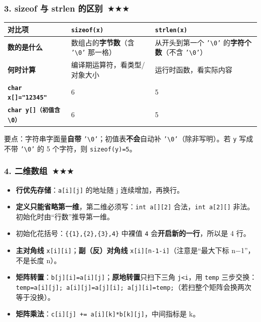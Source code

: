 \documentclass[UTF8,zihao=-4,a4paper]{ctexart}
\newcommand{\cstar}{\textcolor{deepred}{$\bigstar$}}
\begin{document}
\subsubsection*{3. sizeof 与 strlen 的区别\ \cstar\cstar\cstar}
\begin{center}\small
\begin{tabularx}{\linewidth}{>{\bfseries}p{2.6cm} X X}
\toprule
对比项 & \texttt{sizeof(x)} & \texttt{strlen(x)}\\
\midrule
数的是什么 & 数组占的\textbf{字节数}（含 \texttt{'\textbackslash 0'} 那一格） & 从开头到第一个 \texttt{'\textbackslash 0'} 的\textbf{字符个数}（不含 \texttt{'\textbackslash 0'}）\\
何时计算 & 编译期运算符，看类型/对象大小 & 运行时函数，看实际内容\\
\texttt{char x[]="12345"} & 6 & 5\\
\texttt{char y[]（初值含 \textbackslash 0）} & 6 & 5\\
\bottomrule
\end{tabularx}
\end{center}
\noindent 要点：字符串字面量\textbf{自带} \texttt{'\textbackslash 0'}；初值表\textbf{不会}自动补 \texttt{'\textbackslash 0'}（除非写明）。若 \texttt{y} 写成不带 \texttt{'\textbackslash 0'} 的 5 个字符，则 \texttt{sizeof(y)=5}。

\subsubsection*{4. 二维数组\ \cstar\cstar\cstar}
\begin{itemize}
  \item \textbf{行优先存储}：\texttt{a[i][j]} 的地址随 j 连续增加，再换行。
  \item \textbf{定义只能省略第一维}，第二维必须写：\texttt{int a[][2]} 合法，\texttt{int a[2][]} 非法。初始化时由“行数”推导第一维。
  \item 初始化花括号：\texttt{\{\{1\},\{2\},\{3\},4\}} 中裸值 \texttt{4} 会\textbf{开启新的一行}，所以是 4 行。
  \item \textbf{主对角线} \texttt{x[i][i]}；\textbf{副（反）对角线} \texttt{x[i][n-1-i]}（注意是“最大下标 n−1”，不是长度 n）。
  \item \textbf{矩阵转置}：\texttt{b[j][i]=a[i][j]}；\textbf{原地转置}只扫下三角 \texttt{j<i}，用 \texttt{temp} 三步交换：\texttt{temp=a[i][j]; a[i][j]=a[j][i]; a[j][i]=temp;}（若扫整个矩阵会换两次等于没换）。
  \item \textbf{矩阵乘法}：\texttt{c[i][j] += a[i][k]*b[k][j]}，中间指标是 k。
\end{itemize}
\end{document}

